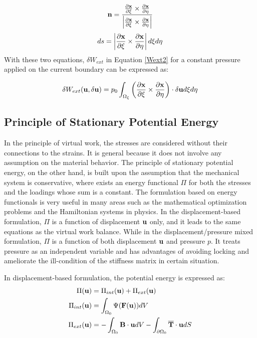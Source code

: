 \begin{equation}
\bold{n} = \frac{  \frac{\partial{\bold{x}}}{\partial{\xi}} \times  \frac{\partial{\bold{x}}}{\partial{\eta}} }{\left| \frac{\partial{\bold{x}}}{\partial{\xi}} \times  \frac{\partial{\bold{x}}}{\partial{\eta}} \right|}
\end{equation}
\begin{equation}
ds = \left|\frac{\partial{\bold{x}}}{\partial{\xi}} \times  \frac{\partial{\bold{x}}}{\partial{\eta}}\right| d\xi{d\eta}
\end{equation}
With these two equations, $\delta W_{ext}$ in Equation \ref{Wext2} for a constant pressure applied on the current boundary can be expressed as:

\begin{equation}
\delta{W_{ext}}(\bold{u}, \delta{\bold{u}}) = p_0\int_{\Omega_{\xi}}  \left(\frac{\partial{\bold{x}}}{\partial{\xi}} \times  \frac{\partial{\bold{x}}}{\partial{\eta}}\right) \cdot\delta{\bold{u}}d\xi{d\eta}
\end{equation}

%
\subsection{Principle of Stationary Potential Energy}
In the principle of virtual work, the stresses are considered without their connections to the strains. It is general because it does not involve any assumption on the material behavior. The principle of stationary potential energy, on the other hand, is built upon the assumption that the mechanical system is conservative, where exists an energy functional $\Pi$ for both the stresses and the loadings whose sum is a constant. The formulation based on energy functionals is very useful in many areas such as the mathematical optimization problems and the Hamiltonian systems in physics. In the displacement-based formulation, $\Pi$ is a function of displacement $\bold{u}$ only, and it leads to the same equations as the virtual work balance. While in the displacement/pressure mixed formulation, $\Pi$ is a function of both displacement $\bold{u}$ and pressure $p$. It treats pressure as an independent variable and has advantages of avoiding locking and ameliorate the ill-condition of the stiffness matrix in certain situation.

In displacement-based formulation, the potential energy is expressed as:
\begin{subequations}
\begin{align}
\Pi(\bold{u}) &= \Pi_{int}(\bold{u}) + \Pi_{ext}(\bold{u}) \\
\Pi_{int}(\bold{u}) &= \int_{\Omega_{0}}\Psi(\bold{F}(\bold{u}))dV  \label{pint} \\
\Pi_{ext}(\bold{u}) &=  - \int_{\Omega_0}\bold{B}\cdot\bold{u}dV -  \int_{\partial{\Omega_0}}\overline{\bold{T}}\cdot{\bold{u}}dS
\label{pext} 
\end{align}
\end{subequations}

